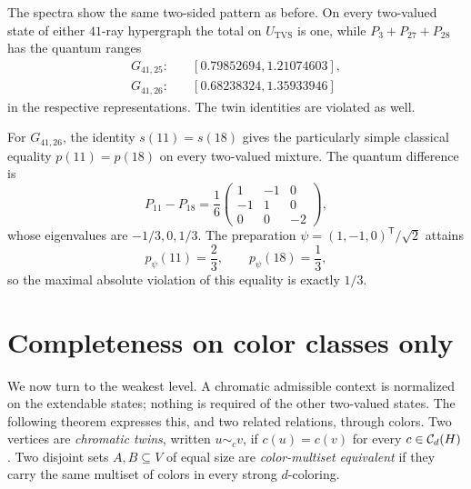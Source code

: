 \documentclass[aps,pra,reprint,superscriptaddress,longbibliography,nofootinbib,floatfix,10pt]{revtex4-2}
\theoremstyle{definition}\newtheorem{definition}[theorem]{Definition}
\theoremstyle{remark}\newtheorem{remark}[theorem]{Remark}
\begin{document}
The spectra show the same two-sided pattern as before. On every two-valued state of either $41$-ray hypergraph the total on $U_{\mathrm{TVS}}$ is one, while $P_3+P_{27}+P_{28}$ has the quantum ranges
\begin{equation}\label{eq:classical-roof-intervals}
\begin{aligned}
G_{41,25}:&\quad[0.79852694,1.21074603],\\
G_{41,26}:&\quad[0.68238324,1.35933946]
\end{aligned}
\end{equation}
in the respective representations. The twin identities are violated as well.

For $G_{41,26}$, the identity $s(11)=s(18)$ gives the particularly simple classical equality $p(11)=p(18)$ on every two-valued mixture. The quantum difference is
\begin{equation}\label{eq:G41-exact-twin-operator}
P_{11}-P_{18}=\frac16\begin{pmatrix}1&-1&0\\-1&1&0\\0&0&-2\end{pmatrix},
\end{equation}
whose eigenvalues are $-1/3,0,1/3$. The preparation $\psi=(1,-1,0)^{\mathsf T}/\sqrt2$ attains
\begin{equation}\label{eq:G41-exact-twin-witness}
p_\psi(11)=\frac23,\qquad p_\psi(18)=\frac13,
\end{equation}
so the maximal absolute violation of this equality is exactly $1/3$.

\section{Completeness on color classes only}\label{sec:complete-rainbow}
We now turn to the weakest level. A chromatic admissible context is normalized on the extendable states; nothing is required of the other two-valued states. The following theorem expresses this, and two related relations, through colors. Two vertices are \emph{chromatic twins}, written $u\sim_c v$, if $c(u)=c(v)$ for every $c\in\mathcal C_d(H)$. Two disjoint sets $A,B\subseteq V$ of equal size are \emph{color-multiset equivalent} if they carry the same multiset of colors in every strong $d$-coloring.
\end{document}
